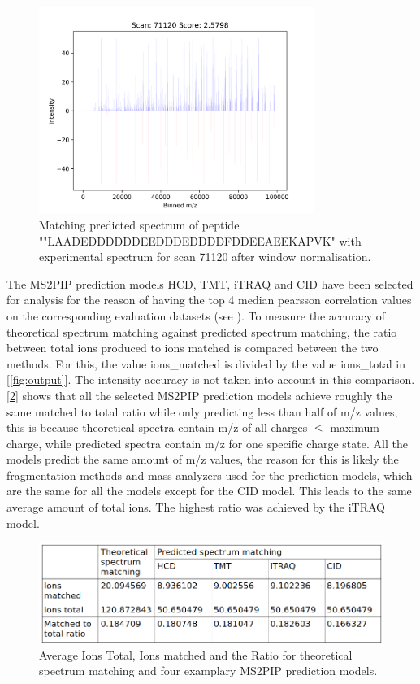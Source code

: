 \documentclass[11pt]{article}
\begin{document}
\begin{figure}[ht]
\centering
\includegraphics[width=0.8\textwidth]{figs/scan_71120_ps=True_wins.png}
\caption{Matching predicted spectrum of peptide ""LAADEDDDDDDEEDDDEDDDDFDDEEAEEKAPVK" with experimental spectrum for scan 71120 after window normalisation.}
\label{fig:scanwin}
\end{figure}

The MS2PIP prediction models HCD, TMT, iTRAQ and CID have been selected for analysis for the reason of having the top 4 median pearsson correlation values on the corresponding evaluation datasets (see \cite{ms2pip-3-13-0}).
To measure the accuracy of theoretical spectrum matching against predicted spectrum matching, the ratio between total ions produced to ions matched is compared between the two methods. For this, the value ions\_matched is divided by the value ions\_total in [\cref{fig:output}]. The intensity accuracy is not taken into account in this comparison. [\cref{fig:ratio_table}] shows that all the selected MS2PIP prediction models achieve roughly the same matched to total ratio while only predicting less than half of m/z values, this is because theoretical spectra contain m/z of all charges $\le$ maximum charge, while predicted spectra contain m/z for one specific charge state. All the models predict the same amount of m/z values, the reason for this is likely the fragmentation methods and mass analyzers used for the prediction models, which are the same for all the models except for the CID model. This leads to the same average amount of total ions. The highest ratio was achieved by the iTRAQ model.

\begin{figure}[ht]
\centering
\includegraphics[width=1\textwidth]{figs/ratio_table.png}
\caption{Average Ions Total, Ions matched and the Ratio for theoretical spectrum matching and four examplary MS2PIP prediction models.}
\label{fig:ratio_table}
\end{figure}
\end{document}
